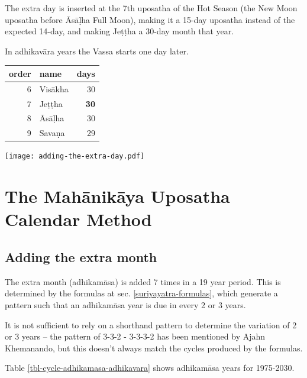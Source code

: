 \documentclass[11pt,oneside]{memoir-article}
\begin{document}
The extra day is inserted at the 7th uposatha of the Hot Season (the New Moon
uposatha before Āsāḷha Full Moon), making it a 15-day uposatha instead of the
expected 14-day, and making Jeṭṭha a 30-day month that
year.\autocite{hasapannyo-zodiac}

In adhikavāra years the Vassa starts one day later.

\begin{center}
\begin{tabular}{rlr}
order & name & days\\
\hline
6 & Visākha & 30\\
7 & Jeṭṭha & \textbf{30}\\
8 & Āsāḷha & 30\\
9 & Savaṇa & 29\\
\end{tabular}
\end{center}

\texttt{[image: adding-the-extra-day.pdf]}

\label{uposatha-tutorial-end}

\clearpage

\chapter{The Mahānikāya Uposatha Calendar Method}
\label{sec-3}
\section{Adding the extra month}
\label{sec-3-1}

The extra month (adhikamāsa) is added 7 times in a 19 year period. This is
determined by the formulas at sec. \ref{suriyayatra-formulas}, which generate a pattern
such that an adhikamāsa year is due in every 2 or 3 years.

It is not sufficient to rely on a shorthand pattern to determine the variation
of 2 or 3 years -- the pattern of 3-3-2 - 3-3-3-2 has been mentioned by Ajahn
Khemanando\autocite{khemanando-adhikamasa}, but this doesn't always match the cycles
produced by the formulas.

Table \ref{tbl-cycle-adhikamasa-adhikavara} shows adhikamāsa years for 1975-2030.

\end{document}
